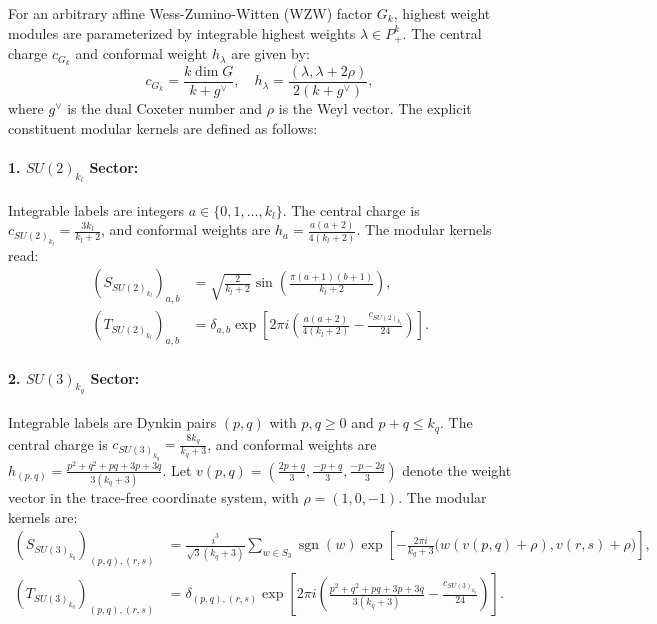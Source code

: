 \documentclass[11pt,letterpaper]{article}
\theoremstyle{plain}
\DeclareMathOperator{\dimop}{dim}
\begin{document}
For an arbitrary affine Wess-Zumino-Witten (WZW) factor $G_k$, highest weight modules are parameterized by integrable highest weights $\lambda \in P_+^k$. The central charge $c_{G_k}$ and conformal weight $h_\lambda$ are given by:
\begin{equation}
c_{G_k} = \frac{k \dimop G}{k + g^\vee}, \quad h_\lambda = \frac{(\lambda, \lambda + 2\rho)}{2(k + g^\vee)},
\end{equation}
where $g^\vee$ is the dual Coxeter number and $\rho$ is the Weyl vector. The explicit constituent modular kernels are defined as follows:

\paragraph{1. $SU(2)_{k_l}$ Sector:} Integrable labels are integers $a \in \{0, 1, \dots, k_l\}$. The central charge is $c_{SU(2)_{k_l}} = \frac{3k_l}{k_l + 2}$, and conformal weights are $h_a = \frac{a(a+2)}{4(k_l + 2)}$. The modular kernels read:
\begin{align}
(S_{SU(2)_{k_l}})_{a, b} &= \sqrt{\frac{2}{k_l + 2}} \sin\left( \frac{\pi (a + 1)(b + 1)}{k_l + 2} \right), \label{eq:S_su2} \\
(T_{SU(2)_{k_l}})_{a, b} &= \delta_{a, b} \exp\left[ 2\pi i \left( \frac{a(a+2)}{4(k_l + 2)} - \frac{c_{SU(2)_{k_l}}}{24} \right) \right]. \label{eq:T_su2}
\end{align}

\paragraph{2. $SU(3)_{k_q}$ Sector:} Integrable labels are Dynkin pairs $(p, q)$ with $p, q \ge 0$ and $p + q \le k_q$. The central charge is $c_{SU(3)_{k_q}} = \frac{8k_q}{k_q + 3}$, and conformal weights are $h_{(p,q)} = \frac{p^2 + q^2 + pq + 3p + 3q}{3(k_q + 3)}$. Let $v(p,q) = \left( \frac{2p+q}{3}, \frac{-p+q}{3}, \frac{-p-2q}{3} \right)$ denote the weight vector in the trace-free coordinate system, with $\rho = (1, 0, -1)$. The modular kernels are:
\begin{align}
(S_{SU(3)_{k_q}})_{(p,q),(r,s)} &= \frac{i^3}{\sqrt{3}(k_q + 3)} \sum_{w \in S_3} \operatorname{sgn}(w) \exp\left[ -\frac{2\pi i}{k_q + 3} \Big( w(v(p,q) + \rho), v(r,s) + \rho \Big) \right], \label{eq:S_su3} \\
(T_{SU(3)_{k_q}})_{(p,q),(r,s)} &= \delta_{(p,q),(r,s)} \exp\left[ 2\pi i \left( \frac{p^2 + q^2 + pq + 3p + 3q}{3(k_q + 3)} - \frac{c_{SU(3)_{k_q}}}{24} \right) \right]. \label{eq:T_su3}
\end{align}
\end{document}
